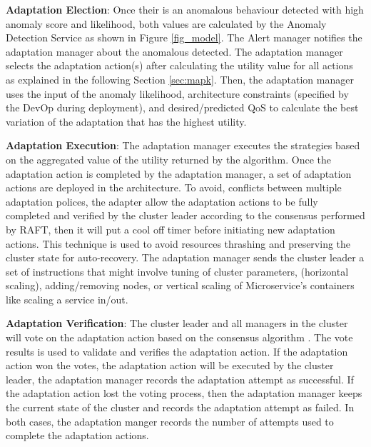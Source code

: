 \documentclass[graybox]{svmult}
\begin{document}
\textbf{Adaptation Election}: Once their is an anomalous behaviour detected with high anomaly score and likelihood, both values are calculated by the Anomaly Detection Service as shown in Figure \ref{fig_model}. The Alert manager notifies the adaptation manager about the anomalous detected. The adaptation manager selects the adaptation action(s) after calculating the utility value for all actions as explained in the following Section \ref{sec:mapk}. Then, the adaptation manager uses the input of the anomaly likelihood, architecture constraints (specified by the DevOp during deployment), and desired/predicted QoS to calculate the best variation of the adaptation that has the highest utility. 


\textbf{Adaptation Execution}: The adaptation manager executes the strategies based on the aggregated value of the utility returned by the algorithm. Once the adaptation action is completed by the adaptation manager, a set of adaptation actions are deployed in the architecture. To avoid, conflicts between multiple adaptation polices, the adapter allow the adaptation actions to be fully completed and verified by the cluster leader according to the consensus performed by RAFT, then it will put a cool off timer before initiating new adaptation actions. This technique is used to avoid resources thrashing and preserving the cluster state for auto-recovery. The adaptation manager sends the cluster leader a set of instructions that might involve tuning of cluster parameters, (horizontal scaling), adding/removing nodes, or vertical scaling of Microservice's containers like scaling a service in/out.  

\textbf{Adaptation Verification}: The cluster leader and all managers in the cluster will vote on the adaptation action based on the consensus algorithm \cite{ongaro2015raft}. The vote results is used to validate and verifies the adaptation action. If the adaptation action won the votes, the adaptation action will be executed by the cluster leader, the adaptation manager records the adaptation attempt as successful. If the adaptation action lost the voting process, then the adaptation manager keeps the current state of the cluster and records the adaptation attempt as failed. In both cases, the adaptation manger records the number of attempts used to complete the adaptation actions.   
 
\end{document}
